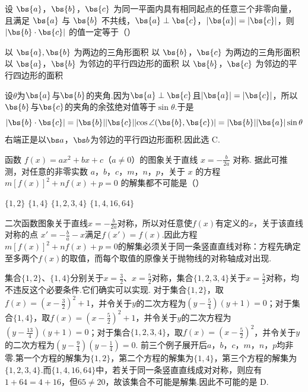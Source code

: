 \begin{problem}
设 \(\bs{a}\)，\(\bs{b}\)，\(\bs{c}\) 为同一平面内具有相同起点的任意三个非零向量，且满足 \(\bs{a}\) 与 \(\bs{b}\) 不共线，\(\bs{a} \perp \bs{c}\)，\(|\bs{a}| = |\bs{c}|\)，则 \(\lvert \bs{b} \cdot \bs{c} \rvert\) 的值一定等于（\quad）

\choices
    {以 \(\bs{a}, \bs{b}\) 为两边的三角形面积}
    {以 \(\bs{b}\)，\(\bs{c}\) 为两边的三角形面积}
    {以 \(\bs{a}\)，\(\bs{b}\) 为邻边的平行四边形的面积}
    {以 \(\bs{b}\)，\(\bs{c}\) 为邻边的平行四边形的面积}

\begin{solution}
设\(\theta\)为\(\bs{a}\)与\(\bs{b}\)的夹角.因为\(\bs{a}\perp\bs{c}\)且\(|\bs{a}|=|\bs{c}|\)，所以\(\bs{b}\)与\(\bs{c}\)的夹角的余弦绝对值等于\(\sin\theta\).于是
\[
\lvert\bs{b}\cdot\bs{c}\rvert
=|\bs{b}||\bs{c}|\lvert\cos\angle(\bs{b},\bs{c})\rvert
=|\bs{b}||\bs{a}|\sin\theta
\]
右端正是以\(\bs a\)，\(\bs b\)为邻边的平行四边形面积.因此选 C.
\end{solution}
\end{problem}

\begin{problem}
函数 \( f(x) = ax^2 + bx + c \)（\(a \neq 0\)）的图象关于直线 \( x = -\frac{b}{2a} \) 对称. 据此可推测，对任意的非零实数 \(a\)，\(b\)，\(c\)，\(m\)，\(n\)，\(p\)，关于 \( x \) 的方程 \( m[f(x)]^2 + nf(x) + p = 0 \) 的解集都不可能是（\quad）

\choices
    {\( \{1, 2\} \)}
    {\( \{1, 4\} \)}
    {\( \{1, 2, 3, 4\} \)}
    {\( \{1, 4, 16, 64\} \)}

\begin{solution}
二次函数图象关于直线\(x=-\frac{b}{2a}\)对称，所以对任意使\(f(x)\)有定义的\(x\)，关于该直线对称的点
\(x'=-\frac{b}{a}-x\)满足\(f(x')=f(x)\).因此方程
\(m[f(x)]^2+nf(x)+p=0\)的解集必须关于同一条竖直直线对称：方程先确定至多两个\(f(x)\)的取值，而每个取值的原像关于抛物线的对称轴成对出现.

集合\(\{1,2\}\)、\(\{1,4\}\)分别关于\(x=\frac{3}{2}\)、\(x=\frac{5}{2}\)对称，集合\(\{1,2,3,4\}\)关于\(x=\frac{5}{2}\)对称，均不违反这个必要条件.它们确实可以实现. 对于集合\(\{1,2\}\)，取\(f(x)=\left(x-\frac{3}{2}\right)^2+1\)，并令关于\(y\)的二次方程为\((y-\tfrac{5}{4})(y+1)=0\)；对于集合\(\{1,4\}\)，取\(f(x)=\left(x-\frac{5}{2}\right)^2+1\)，并令关于\(y\)的二次方程为\((y-\tfrac{13}{4})(y+1)=0\)；对于集合\(\{1,2,3,4\}\)，取\(f(x)=\left(x-\frac{5}{2}\right)^2\)，并令关于\(y\)的二次方程为\((y-\tfrac{9}{4})(y-\tfrac{1}{4})=0\).
前三个例子展开后\(a\)，\(b\)，\(c\)，\(m\)，\(n\)，\(p\)均非零.第一个方程的解集为\(\{1,2\}\)，第二个方程的解集为\(\{1,4\}\)，第三个方程的解集为\(\{1,2,3,4\}\).而\(\{1,4,16,64\}\)中，若关于同一条竖直直线成对对称，则应有\(1+64=4+16\)，但\(65\neq20\)，故该集合不可能是解集.因此不可能的是 D.
\end{solution}
\end{problem}

